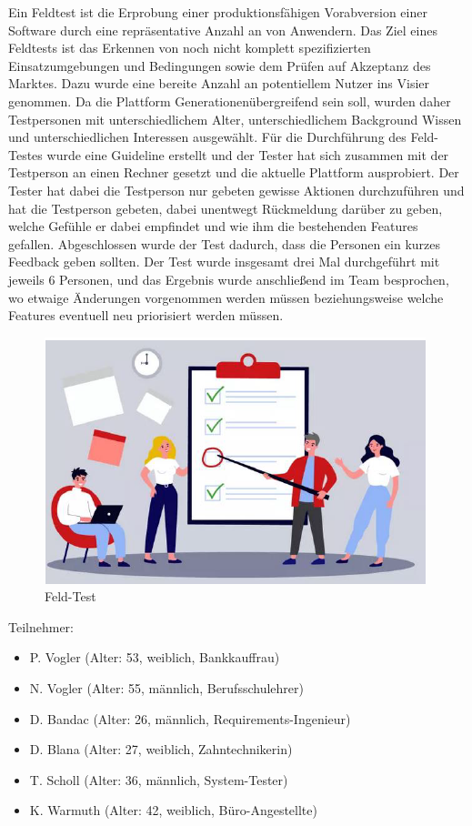 Ein Feldtest ist die Erprobung einer produktionsfähigen Vorabversion einer Software durch eine repräsentative Anzahl an von Anwendern. Das Ziel eines Feldtests ist das Erkennen von noch nicht komplett spezifizierten Einsatzumgebungen und Bedingungen sowie dem Prüfen auf Akzeptanz des Marktes.
Dazu wurde eine bereite Anzahl an potentiellem Nutzer ins Visier genommen. Da die Plattform Generationenübergreifend sein soll, wurden daher Testpersonen mit unterschiedlichem Alter, unterschiedlichem Background Wissen und unterschiedlichen Interessen ausgewählt.
Für die Durchführung des Feld-Testes wurde eine Guideline erstellt und der Tester hat sich zusammen mit der Testperson an einen Rechner gesetzt und die aktuelle Plattform ausprobiert. Der Tester hat dabei die Testperson nur gebeten gewisse Aktionen durchzuführen und hat die Testperson gebeten, dabei unentwegt Rückmeldung darüber zu geben, welche Gefühle er dabei empfindet und wie ihm die bestehenden Features gefallen. Abgeschlossen wurde der Test dadurch, dass die Personen ein kurzes Feedback geben sollten.
Der Test wurde insgesamt drei Mal durchgeführt mit jeweils 6 Personen, und das Ergebnis wurde anschließend im Team besprochen, wo etwaige Änderungen vorgenommen werden müssen beziehungsweise welche Features eventuell neu priorisiert werden müssen.

\begin{figure}[!htb]
  \centering
  \includegraphics[width=.9\textwidth]{figures/rebecca/Feld_Test_Konzept.png}
  \caption[]{Feld-Test}
  \label{fig:Feldtest}
\end{figure}

Teilnehmer:
\begin{itemize}
    \item P. Vogler (Alter: 53, weiblich, Bankkauffrau)
    \item N. Vogler (Alter: 55, männlich, Berufsschulehrer)
    \item D. Bandac (Alter: 26, männlich, Requirements-Ingenieur)
    \item D. Blana (Alter: 27, weiblich, Zahntechnikerin)
    \item T. Scholl (Alter: 36, männlich, System-Tester)
    \item K. Warmuth (Alter: 42, weiblich, Büro-Angestellte)
  \end{itemize}

